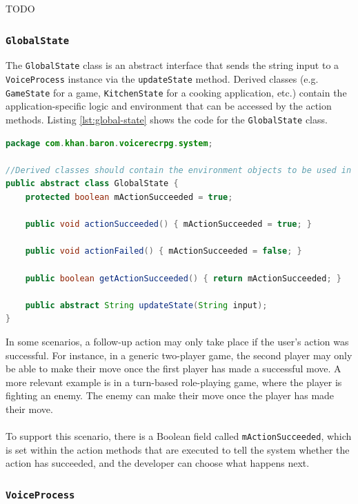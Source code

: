 \documentclass[11pt]{article}
\begin{document}
TODO

\subsubsection{\texttt{GlobalState}}

The \texttt{GlobalState} class is an abstract interface that sends the string input to a \texttt{VoiceProcess} instance via the \texttt{updateState} method. Derived classes (e.g. \texttt{GameState} for a game, \texttt{KitchenState} for a cooking application, etc.) contain the application-specific logic and environment that can be accessed by the action methods. Listing \ref{lst:global-state} shows the code for the \texttt{GlobalState} class.

\begin{lstlisting}[language=Java, caption=GlobalState.java, label={lst:global-state}]
package com.khan.baron.voicerecrpg.system;

//Derived classes should contain the environment objects to be used in actions
public abstract class GlobalState {
    protected boolean mActionSucceeded = true;
    
    public void actionSucceeded() { mActionSucceeded = true; }
    
    public void actionFailed() { mActionSucceeded = false; }
    
    public boolean getActionSucceeded() { return mActionSucceeded; }
    
    public abstract String updateState(String input);
}
\end{lstlisting}

In some scenarios, a follow-up action may only take place if the user's action was successful. For instance, in a generic two-player game, the second player may only be able to make their move once the first player has made a successful move. A more relevant example is in a turn-based role-playing game, where the player is fighting an enemy. The enemy can make their move once the player has made their move.
\\
\\
To support this scenario, there is a Boolean field called \texttt{mActionSucceeded}, which is set within the action methods that are executed to tell the system whether the action has succeeded, and the developer can choose what happens next.

\subsubsection{\texttt{VoiceProcess}}
\end{document}
